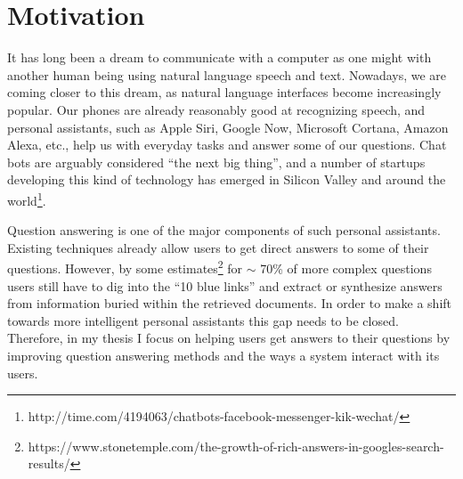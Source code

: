 %
%
\label{chapter:intro}

\setcounter{page}{1}
\pagestyle{myheadings}


\newtheorem{definition}{Definition}
\newtheorem{proposition}{Proposition}


\section{Motivation}

It has long been a dream to communicate with a computer as one might with another human being using natural language speech and text.
Nowadays, we are coming closer to this dream, as natural language interfaces become increasingly popular.
Our phones are already reasonably good at recognizing speech, and personal assistants, such as Apple Siri, Google Now, Microsoft Cortana, Amazon Alexa, etc., help us with everyday tasks and answer some of our questions.
Chat bots are arguably considered ``the next big thing'', and a number of startups developing this kind of technology has emerged in Silicon Valley and around the world\footnote{http://time.com/4194063/chatbots-facebook-messenger-kik-wechat/}.

Question answering is one of the major components of such personal assistants.
Existing techniques already allow users to get direct answers to some of their questions.
However, by some estimates\footnote{https://www.stonetemple.com/the-growth-of-rich-answers-in-googles-search-results/} for $\sim$ 70\% of more complex questions users still have to dig into the ``10 blue links'' and extract or synthesize answers from information buried within the retrieved documents.
In order to make a shift towards more intelligent personal assistants this gap needs to be closed.
Therefore, in my thesis I focus on helping users get answers to their questions by improving question answering methods and the ways a system interact with its users.

